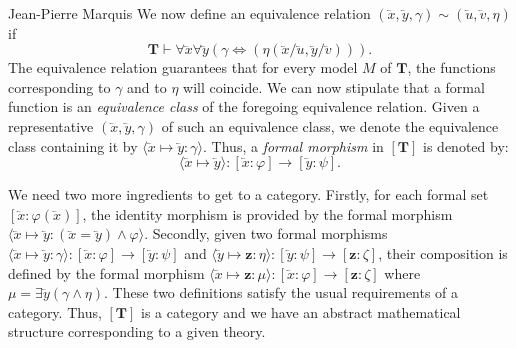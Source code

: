 \begin{artengenv}{Jean-Pierre Marquis}
We now define an equivalence relation \( (\lvec{x}, \lvec{y}, \gamma) \sim (\lvec{u}, \lvec{v}, \eta) \) if 
%
\[
\mathbf{T} \vdash \forall \lvec{x} \forall \lvec{y} (\gamma \Leftrightarrow (\eta(\lvec{x}/\lvec{u}, \lvec{y}/\lvec{v}))) \text{.}
\]
%
The equivalence relation guarantees that for every model \( M \) of \( \mathbf{T} \), the functions corresponding to \( \gamma \) and to \( \eta \) will coincide. We can now stipulate that a formal function is an \emph{equivalence class} of the foregoing equivalence relation. Given a representative \( (\lvec{x}, \lvec{y}, \gamma) \) of such an equivalence class, we denote the equivalence class containing it by \( \langle \lvec{x} \mapsto \lvec{y}\colon \gamma \rangle \). Thus, a \textit{formal morphism} in \( [\mathbf{T}] \) is denoted by:
%
\[
\langle \lvec{x} \mapsto \lvec{y} \rangle \colon [\lvec{x}\colon \varphi] \rightarrow [\lvec{y}\colon \psi].
\]

We need two more ingredients to get to a category. Firstly, for each formal set \( [\lvec{x}\colon \varphi(\lvec{x})] \), the identity morphism is provided by the formal morphism \( \langle \lvec{x} \mapsto \lvec{y} \colon ( \lvec{x} = \lvec{y} ) \land \varphi \rangle \). Secondly, given two formal morphisms \( \langle \lvec{x} \mapsto \lvec{y} \colon \gamma \rangle\colon [\lvec{x}\colon \varphi] \rightarrow [\lvec{y}\colon \psi] \) and \( \langle \lvec{y} \mapsto \mathbf{z} \colon \eta \rangle\colon [\lvec{y}\colon \psi] \rightarrow [\mathbf{z}\colon \zeta] \), their composition is defined by the formal morphism \( \langle \lvec{x} \mapsto \mathbf{z} \colon \mu \rangle\colon [\lvec{x}\colon \varphi] \rightarrow [\mathbf{z}\colon \zeta] \) where \( \mu = \exists \lvec{y} (\gamma \land \eta) \). These two definitions satisfy the usual requirements of a category. Thus, \( [\mathbf{T}] \) is a category and we have an abstract mathematical structure corresponding to a given theory.


\end{artengenv}
